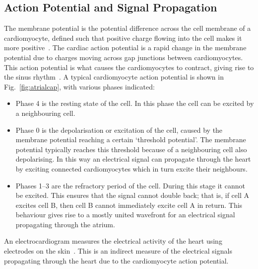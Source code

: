\subsection{Action Potential and Signal Propagation}

The membrane potential is the potential difference across the cell membrane of a cardiomyocyte, defined such that positive charge flowing into the cell makes it more positive~\cite{nattel}. The cardiac action potential is a rapid change in the membrane potential due to charges moving across gap junctions between cardiomyocytes. This action potential is what causes the cardiomyocytes to contract, giving rise to the sinus rhythm~\cite{katz2010physiology}. 
A typical cardiomyocyte action potential is shown in Fig.~\ref{fig:atrialcap}, with various phases indicated:
\begin{itemize}
	\item Phase 4 is the resting state of the cell. In this phase the cell can be excited by a neighbouring cell.
	\item Phase 0 is the depolarisation or excitation of the cell, caused by the membrane potential reaching a certain `threshold potential'. The membrane potential typically reaches this threshold because of a neighbouring cell also depolarising. In this way an electrical signal can propagate through the heart by exciting connected cardiomyocytes which in turn excite their neighbours.
	\item Phases 1--3 are the refractory period of the cell. During this stage it cannot be excited. This ensures that the signal cannot double back; that is, if cell A excites cell B, then cell B cannot immediately excite cell A in return. This behaviour gives rise to a mostly united wavefront for an electrical signal propagating through the atrium.
\end{itemize}

An electrocardiogram measures the electrical activity of the heart using electrodes on the skin~\cite{pullan2005mathematically}. This is an indirect measure of the electrical signals propagating through the heart due to the cardiomyocyte action potential.

